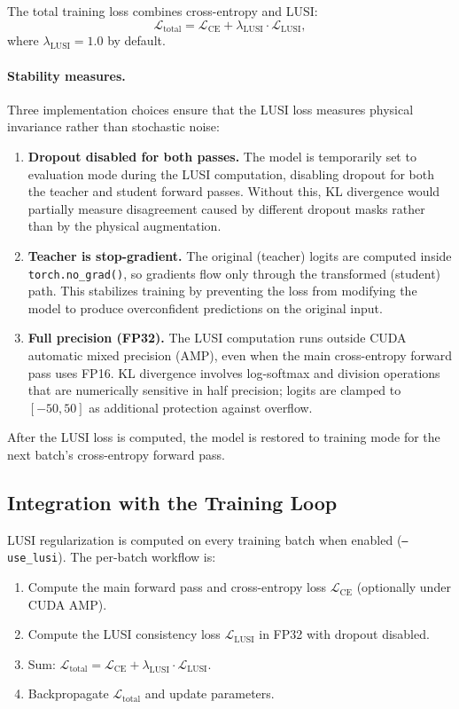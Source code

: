 \documentclass[11pt]{report}
\begin{document}
The total training loss combines cross-entropy and LUSI:
\begin{equation}
\mathcal{L}_{\text{total}} = \mathcal{L}_{\text{CE}} + \lambda_{\text{LUSI}} \cdot \mathcal{L}_{\text{LUSI}},
\label{eq:lusi_total}
\end{equation}
where $\lambda_{\text{LUSI}} = 1.0$ by default.

\paragraph{Stability measures.}
Three implementation choices ensure that the LUSI loss measures physical invariance rather than stochastic noise:
\begin{enumerate}[nosep]
  \item \textbf{Dropout disabled for both passes.} The model is temporarily set to evaluation mode during the LUSI computation, disabling dropout for both the teacher and student forward passes. Without this, KL divergence would partially measure disagreement caused by different dropout masks rather than by the physical augmentation.
  \item \textbf{Teacher is stop-gradient.} The original (teacher) logits are computed inside \texttt{torch.no\_grad()}, so gradients flow only through the transformed (student) path. This stabilizes training by preventing the loss from modifying the model to produce overconfident predictions on the original input.
  \item \textbf{Full precision (FP32).} The LUSI computation runs outside CUDA automatic mixed precision (AMP), even when the main cross-entropy forward pass uses FP16. KL divergence involves log-softmax and division operations that are numerically sensitive in half precision; logits are clamped to $[-50, 50]$ as additional protection against overflow.
\end{enumerate}
After the LUSI loss is computed, the model is restored to training mode for the next batch’s cross-entropy forward pass.

\subsection{Integration with the Training Loop}
\label{sec:lusi_training}

LUSI regularization is computed on every training batch when enabled (\texttt{--use\_lusi}). The per-batch workflow is:
\begin{enumerate}[nosep]
  \item Compute the main forward pass and cross-entropy loss $\mathcal{L}_{\text{CE}}$ (optionally under CUDA AMP).
  \item Compute the LUSI consistency loss $\mathcal{L}_{\text{LUSI}}$ in FP32 with dropout disabled.
  \item Sum: $\mathcal{L}_{\text{total}} = \mathcal{L}_{\text{CE}} + \lambda_{\text{LUSI}} \cdot \mathcal{L}_{\text{LUSI}}$.
  \item Backpropagate $\mathcal{L}_{\text{total}}$ and update parameters.
\end{enumerate}
\end{document}
